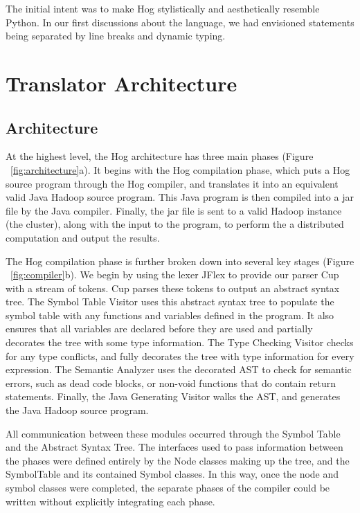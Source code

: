 \documentclass{report}
\begin{document}
The initial intent was to make Hog stylistically and aesthetically resemble Python. In our first discussions about the language, we had envisioned statements being separated by line breaks and dynamic typing.


\chapter{Translator Architecture}
\label{chap:trans}

\section{Architecture}
At the highest level, the Hog architecture has three main phases (Figure ~\ref{fig:architecture}a). It begins with the Hog compilation phase, which puts a Hog source program through the Hog compiler, and translates it into an equivalent valid Java Hadoop source program. This Java program is then compiled into a jar file by the Java compiler. Finally, the jar file is sent to a valid Hadoop instance (the cluster), along with the input to the program, to perform the a distributed computation and output the results.

The Hog compilation phase is further broken down into several key stages (Figure ~\ref{fig:compiler}b). We begin by using the lexer JFlex to provide our parser Cup with a stream of tokens. Cup parses these tokens to output an abstract syntax tree. The Symbol Table Visitor uses this abstract syntax tree to populate the symbol table with any functions and variables defined in the program. It also ensures that all variables are declared before they are used and partially decorates the tree with some type information. The Type Checking Visitor checks for any type conflicts, and fully decorates the tree with type information for every expression. The Semantic Analyzer uses the decorated AST to check for semantic errors, such as dead code blocks, or non-void functions that do contain return statements. Finally, the Java Generating Visitor walks the AST, and generates the Java Hadoop source program.

All communication between these modules occurred through the Symbol Table and the Abstract Syntax Tree. The interfaces used to pass information between the phases were defined entirely by the Node classes making up the tree, and the SymbolTable and its contained Symbol classes. In this way, once the node and symbol classes were completed, the separate phases of the compiler could be written without explicitly integrating each phase.
\end{document}
